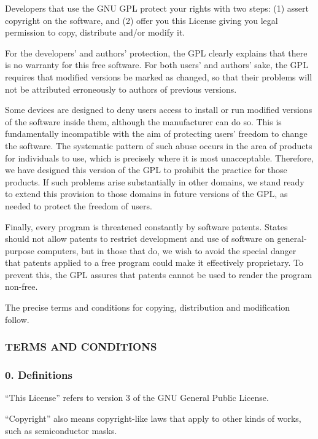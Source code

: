 \documentclass[a4paper, 11pt, twoside]{article}
\begin{document}
Developers that use the GNU GPL protect your rights with two steps: (1) assert copyright on the software, and (2) offer you this License giving you legal permission to copy, distribute and/or modify it.

For the developers' and authors' protection, the GPL clearly explains that there is no warranty for this free software. For both users' and authors' sake, the GPL requires that modified versions be marked as changed, so that their problems will not be attributed erroneously to authors of previous versions.

Some devices are designed to deny users access to install or run modified versions of the software inside them, although the manufacturer can do so. This is fundamentally incompatible with the aim of protecting users' freedom to change the software. The systematic pattern of such abuse occurs in the area of products for individuals to use, which is precisely where it is most unacceptable. Therefore, we have designed this version of the GPL to prohibit the practice for those products. If such problems arise substantially in other domains, we stand ready to extend this provision to those domains in future versions of the GPL, as needed to protect the freedom of users.

Finally, every program is threatened constantly by software patents. States should not allow patents to restrict development and use of software on general-purpose computers, but in those that do, we wish to avoid the special danger that patents applied to a free program could make it effectively proprietary. To prevent this, the GPL assures that patents cannot be used to render the program non-free.

The precise terms and conditions for copying, distribution and modification follow.

\subsubsection{TERMS AND CONDITIONS}

\subsubsection{0. Definitions}

“This License” refers to version 3 of the GNU General Public License.

“Copyright” also means copyright-like laws that apply to other kinds of works, such as semiconductor masks.
\end{document}
